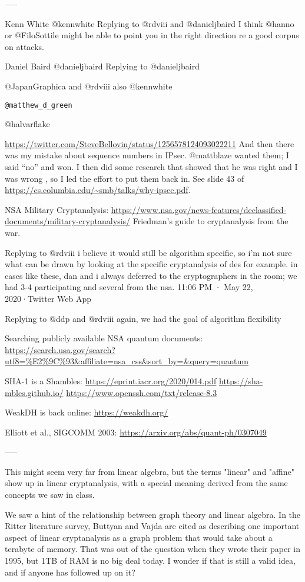 \documentclass[%
 aip,
 jmp,%
 amsmath,amssymb,
 reprint,%
]{revtex4-1}
\begin{document}
-----


Kenn White
@kennwhite
Replying to 
@rdviii
 and 
@danieljbaird
I think 
@hanno
 or 
@FiloSottile
 might be able to point you in the right direction re a good corpus on
 attacks.

Daniel Baird
@danieljbaird
Replying to 
@danieljbaird
 
@JapanGraphica
 and 
@rdviii
also 
@kennwhite
  
\verb|@matthew_d_green|
  
@halvarflake

\url{https://twitter.com/SteveBellovin/status/1256578124093022211}
And then there was my mistake about sequence numbers in IPsec. 
@mattblaze
 wanted them; I said “no” and won. I then did some research that
 showed that he was right and I was wrong , so I led the effort to put
 them back in. See slide 43 of
\url{https://cs.columbia.edu/~smb/talks/why-ipsec.pdf}.

NSA Military Cryptanalysis:
\url{https://www.nsa.gov/news-features/declassified-documents/military-cryptanalysis/}
Friedman's guide to cryptanalysis from the war.

Replying to 
@rdviii
i believe it would still be algorithm specific, so i'm not sure what can be drawn by looking at the specific cryptanalysis of des for example.  in cases like these, dan and i always deferred to the cryptographers in the room; we had 3-4 participating and several from the nsa.
11:06 PM · May 22, 2020·Twitter Web App

Replying to 
@ddp
 and 
@rdviii
again, we had the goal of algorithm flexibility

Searching publicly available NSA quantum documents:
\url{https://search.usa.gov/search?utf8=%E2%9C%93&affiliate=nsa_css&sort_by=&query=quantum}

SHA-1 is a Shambles:
\url{https://eprint.iacr.org/2020/014.pdf}
\url{https://sha-mbles.github.io/}
\url{https://www.openssh.com/txt/release-8.3}

WeakDH is back online:
\url{https://weakdh.org/}

Elliott et al., SIGCOMM 2003:
\url{https://arxiv.org/abs/quant-ph/0307049}

-----

This might seem very far from linear algebra, but the terms "linear"
and "affine" show up in linear cryptanalysis, with a special meaning
derived from the same concepts we saw in class.

We saw a hint of the relationship between graph theory and linear
algebra.  In the Ritter literature survey, Buttyan and Vajda are cited
as describing one important aspect of linear cryptanalysis as a graph
problem that would take about a terabyte of memory.  That was out of
the question when they wrote their paper in 1995, but 1TB of RAM is no
big deal today.  I wonder if that is still a valid idea, and if anyone
has followed up on it?
\end{document}
